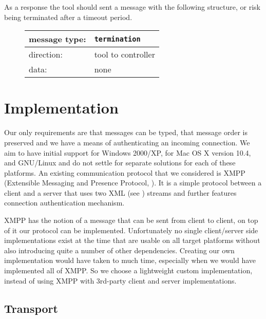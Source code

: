 \documentclass{article}
\newcommand{\msg}[1]{\texttt{#1}}
\begin{document}
   \noindent As a response the tool should sent a message with the following
   structure, or risk being terminated after a timeout period.

   \begin{figure}[H]
    \begin{center}
     \begin{tabular}{|ll|}
      \hline
       message type:   & \msg{termination} \\
      \hline
       direction:      & tool to controller \\
       data:           & none \\
      \hline
     \end{tabular}
    \end{center}
   \end{figure}

 \section{Implementation} \label{s:implementation}

   Our only requirements are that messages can be typed, that message order is
   preserved and we have a means of authenticating an incoming connection. We
   aim to have initial support for Windows 2000/XP, for Mac OS X version 10.4,
   and GNU/Linux and do not settle for separate solutions for each of these
   platforms. An existing communication protocol that we considered is XMPP
   (Extensible Messaging and Presence Protocol, \cite{rfc3920}). It is a simple
   protocol between a client and a server that uses two XML (see
   \cite{Sperberg-McQueen:06:EML}) streams and further features connection
   authentication mechanism.

   XMPP has the notion of a message that can be sent from client to client, on
   top of it our protocol can be implemented.   Unfortunately no single
   client/server side implementations exist at the time that are usable on all
   target platforms without also introducing quite a number of other
   dependencies. Creating our own implementation would have taken to much time,
   especially when we would have implemented all of XMPP.  So we choose a lightweight
   custom implementation, instead of using XMPP with 3rd-party client and
   server implementations.

  \subsection{Transport}
\end{document}
